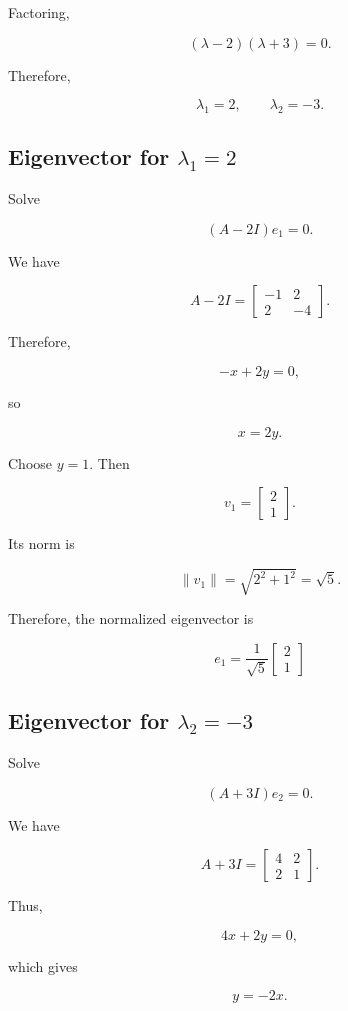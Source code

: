 \documentclass[12pt]{article}
\begin{document}
Factoring,

\[
(\lambda-2)(\lambda+3)=0.
\]

Therefore,

\[
\boxed{\lambda_1=2,\qquad\lambda_2=-3}.
\]

\subsection*{Eigenvector for $\lambda_1=2$}

Solve

\[
(A-2I)e_1=0.
\]

We have

\[
A-2I=
\begin{bmatrix}
-1 & 2\\
2 & -4
\end{bmatrix}.
\]

Therefore,

\[
-x+2y=0,
\]

so

\[
x=2y.
\]

Choose $y=1$. Then

\[
v_1=
\begin{bmatrix}
2\\
1
\end{bmatrix}.
\]

Its norm is

\[
\|v_1\|
=
\sqrt{2^2+1^2}
=
\sqrt{5}.
\]

Therefore, the normalized eigenvector is

\[
\boxed{
e_1=
\frac{1}{\sqrt{5}}
\begin{bmatrix}
2\\
1
\end{bmatrix}}
\]

\subsection*{Eigenvector for $\lambda_2=-3$}

Solve

\[
(A+3I)e_2=0.
\]

We have

\[
A+3I=
\begin{bmatrix}
4 & 2\\
2 & 1
\end{bmatrix}.
\]

Thus,

\[
4x+2y=0,
\]

which gives

\[
y=-2x.
\]
\end{document}
